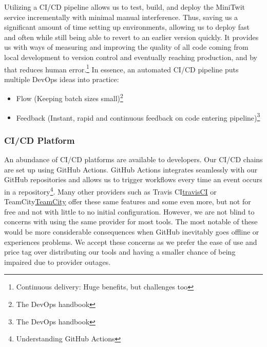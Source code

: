 Utilizing a CI/CD pipeline allows us to test, build, and deploy the MiniTwit service incrementally with minimal manual interference. Thus, saving us a significant amount of time setting up environments, allowing us to deploy fast and often while still being able to revert to an earlier version quickly.
It provides us with ways of measuring and improving the quality of all code coming from local development to version control and eventually reaching production, and by that reduces human error.\footnote{Continuous delivery: Huge benefits, but challenges too\cite{Chen2015}}
In essence, an automated CI/CD pipeline puts multiple DevOps ideas into practice: 
\begin{itemize}
    \item Flow (Keeping batch sizes small)\footnote{\label{handbook}The DevOps handbook\cite{Kim2016}} 
    \item Feedback (Instant, rapid and continuous feedback on code entering pipeline)\footnote{The DevOps handbook\cite{Kim2016}}
\end{itemize}


\subsubsection{CI/CD Platform}
\label{subsubsec:cicdPlatform}
An abundance of CI/CD platforms are available to developers. Our CI/CD chains are set up using GitHub Actions. GitHub Actions integrates seamlessly with our GitHub repositories and allows us to trigger workflows every time an event occurs in a repository\footnote{Understanding GitHub Actions\cite{githubActions}}. Many other providers such as Travis CI\href{https://travis-ci.org/}{travisCI} or TeamCity\href{https://www.jetbrains.com/teamcity/}{TeamCity} offer these same features and some even more, but not for free and not with little to no initial configuration. However, we are not blind to concerns with using the same provider for most tools. The most notable of these would be more considerable consequences when GitHub inevitably goes offline or experiences problems. We accept these concerns as we prefer the ease of use and price tag over distributing our tools and having a smaller chance of being impaired due to provider outages.

